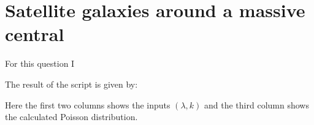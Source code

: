 \section{Satellite galaxies around a massive central}

For this question I 



The result of the script is given by:



Here the first two columns shows the inputs $(\lambda, k)$ and the third column shows the calculated Poisson distribution.
